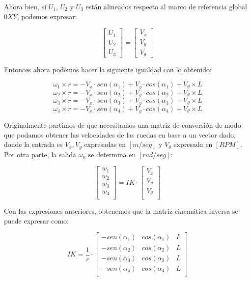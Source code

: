 Ahora bien, si $U_1$, $U_2$ y $U_3$ están alineados respecto al marco de referencia global $0XY$, podemos expresar:

$$ \begin{bmatrix} U_1 \\ U_2 \\ U_3 \end{bmatrix} = \begin{bmatrix} V_x \\ V_y \\ V_\theta \end{bmatrix} $$

Entonces ahora podemos hacer la siguiente igualdad con lo obtenido:

$$ \omega_1 \times r = -V_x \cdot sen(\alpha_1) + V_y \cdot cos(\alpha_1) + V_\theta \times L $$
$$ \omega_2 \times r = -V_x \cdot sen(\alpha_2) + V_y \cdot cos(\alpha_2) + V_\theta \times L $$
$$ \omega_3 \times r = -V_x \cdot sen(\alpha_3) + V_y \cdot cos(\alpha_3) + V_\theta \times L $$
$$ \omega_4 \times r = -V_x \cdot sen(\alpha_4) + V_y \cdot cos(\alpha_4) + V_\theta \times L $$

Originalmente partimos de que necesitamos una matriz de conversión de modo que podamos obtener las velocidades de las ruedas en base a un vector dado, donde la entrada es $V_x, V_y$ expresadas en $[m/seg]$ y $V_\theta$ expresada en $[RPM]$. Por otra parte, la salida $\omega_n$ se determina en $[rad/seg]$:

$$ \begin{bmatrix} w_1 \\ w_2 \\ w_3 \\ w_4 \\ \end{bmatrix} = IK \cdot \begin{bmatrix} V_x \\ V_y \\ V_\theta \\ \end{bmatrix} $$

Con las expresiones anteriores, obtenemos que la matriz cinemática inversa se puede expresar como:

$$ IK = 
    \frac{1}{r}
    \cdot
    \begin{bmatrix}
        {-sen(\alpha_1)} & {cos(\alpha_1)} & L \\
        {-sen(\alpha_2)} & {cos(\alpha_2)} & L \\
        {-sen(\alpha_3)} & {cos(\alpha_3)} & L \\
        {-sen(\alpha_4)} & {cos(\alpha_4)} & L \\
    \end{bmatrix} $$

